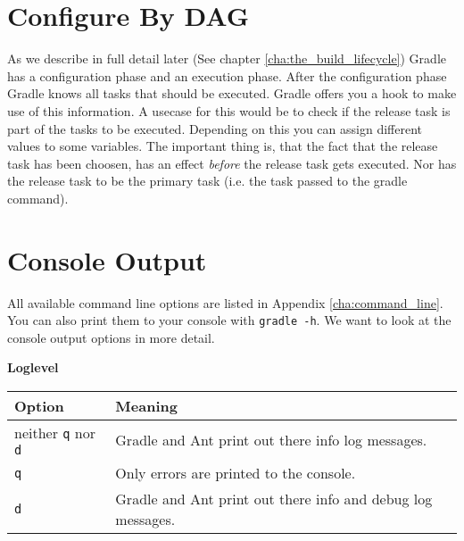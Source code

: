 \section{Configure By DAG}
As we describe in full detail later (See chapter \ref{cha:the_build_lifecycle}) Gradle has a configuration phase and an execution phase. After the configuration phase Gradle knows all tasks that should be executed. Gradle offers you a hook to make use of this information. A usecase for this would be to check if the release task is part of the tasks to be executed. Depending on this you can assign different values to some variables.
The important thing is, that the fact that the release task has been choosen, has an effect \emph{before} the release task gets executed. Nor has the release task to be the primary task (i.e. the task passed to the gradle command). 

  
\section{Console Output}
All available command line options are listed in Appendix \ref{cha:command_line}. You can also print them to your console with \texttt{gradle -h}. We want to look at the console output options in more detail. 
\\

\centerline{\textbf{Loglevel}}
\medskip

\begin{tabular}{|l|l|} \hline
Option & Meaning  \\ \hline
neither \texttt{q} nor \texttt{d} & Gradle and Ant print out there info log messages.  \\ \hline
\texttt{q} & Only errors are printed to the console.  \\ \hline
\texttt{d} & Gradle and Ant print out there info and debug log messages. \\ \hline
\end{tabular}
\medskip

